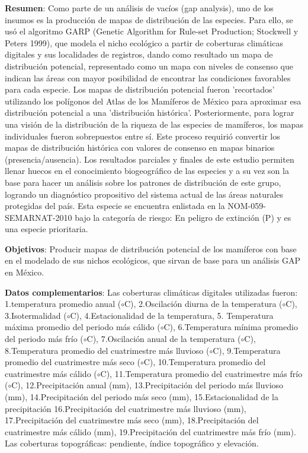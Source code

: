 \documentclass[twoside]{book}
\begin{document}
{\textbf{Resumen}: Como parte de un análisis de vacíos (gap analysis), uno de los insumos es la producción de mapas de distribución de las especies. Para ello, se usó el algoritmo GARP (Genetic Algorithm for Rule-set Production; Stockwell y Peters 1999), que modela el nicho ecológico a partir de coberturas climáticas digitales y sus localidades de registros, dando como resultado un mapa de distribución potencial, representado como un mapa con niveles de consenso que indican las áreas con mayor posibilidad de encontrar las condiciones favorables para cada especie. Los mapas de distribución potencial fueron 'recortados' utilizando los polígonos del Atlas de los Mamíferos de México para aproximar esa distribución potencial a una 'distribución histórica'. Posteriormente, para lograr una visión de la distribución de la riqueza de las especies de mamíferos, los mapas individuales fueron sobrepuestos entre sí. Este proceso requirió convertir los mapas de distribución histórica con valores de consenso en mapas binarios (presencia/ausencia). Los resultados parciales y finales de este estudio permiten llenar huecos en el conocimiento biogeográfico de las especies y a su vez son la base para hacer un análisis sobre los patrones de distribución de este grupo, logrando un diagnóstico propositivo del sistema actual de las áreas naturales protegidas del país. Esta especie se encuentra enlistada en la NOM-059-SEMARNAT-2010 bajo la categoría de riesgo: En peligro de extinción (P) y es una especie prioritaria.

\textbf{Objetivos}: Producir mapas de distribución potencial de los mamíferos con base en el modelado de sus nichos ecológicos, que sirvan de base para un análisis GAP en México.

\textbf{Datos complementarios}: Las coberturas climáticas digitales utilizadas fueron: 1.temperatura promedio anual ($\circ$C), 2.Oscilación diurna de la temperatura ($\circ$C), 3.Isotermalidad ($\circ$C), 4.Estacionalidad de la temperatura, 5. Temperatura máxima promedio del periodo más cálido ($\circ$C), 6.Temperatura mínima promedio del periodo más frío ($\circ$C), 7.Oscilación anual de la temperatura ($\circ$C), 8.Temperatura promedio del cuatrimestre más lluvioso ($\circ$C), 9.Temperatura promedio del cuatrimestre más seco ($\circ$C), 10.Temperatura promedio del cuatrimestre más cálido ($\circ$C), 11.Temperatura promedio del cuatrimestre más frío ($\circ$C), 12.Precipitación anual (mm), 13.Precipitación del periodo más lluvioso (mm), 14.Precipitación del periodo más seco (mm), 15.Estacionalidad de la precipitación 16.Precipitación del cuatrimestre más lluvioso (mm), 17.Precipitación del cuatrimestre más seco (mm), 18.Precipitación del cuatrimestre más cálido (mm), 19.Precipitación del cuatrimestre más frío (mm). Las coberturas topográficas: pendiente, índice topográfico y elevación.

}
\end{document}

